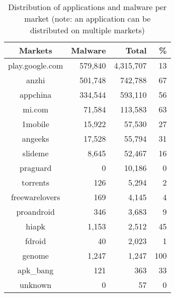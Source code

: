 \begin{table}[t]
	\centering
        \caption[Distribution of applications and malware per market]{Distribution of applications and malware per market (note: an application can be distributed on multiple markets)}
	\begin{tabular}{|c|r|r|r|}
		\hline
                \textbf{Markets}         & \textbf{Malware} & \textbf{Total}     & \textbf{\%}  \\
		\hline
		play.google.com & 579,840 & 4,315,707 & 13  \\
		anzhi           & 501,748 & 742,788   & 67  \\
		appchina        & 334,544 & 593,110   & 56  \\
		mi.com          & 71,584  & 113,583   & 63  \\
		1mobile         & 15,922  & 57,530    & 27  \\
		angeeks         & 17,528  & 55,794    & 31  \\
		slideme         & 8,645   & 52,467    & 16  \\
		praguard        & 0       & 10,186    & 0   \\
		torrents        & 126     & 5,294     & 2   \\
		freewarelovers  & 169     & 4,145     & 4   \\
		proandroid      & 346     & 3,683     & 9   \\
		hiapk           & 1,153   & 2,512     & 45  \\
		fdroid          & 40      & 2,023     & 1   \\
		genome          & 1,247   & 1,247     & 100 \\
		apk\_bang       & 121     & 363       & 33  \\
		unknown         & 0       & 57        & 0   \\
		\hline
	\end{tabular}
	\label{table:apgraph:markets}
\end{table}

